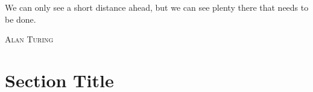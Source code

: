 \epigraph{We can only see a short distance ahead, but we can see plenty there that needs to be done.}%
{\textsc{Alan Turing}}
\null\vfill
\newpage
\blankpagewithnumber
\section{Section Title}
\lipsum[1]
\newpage
\blankpagewithnumber